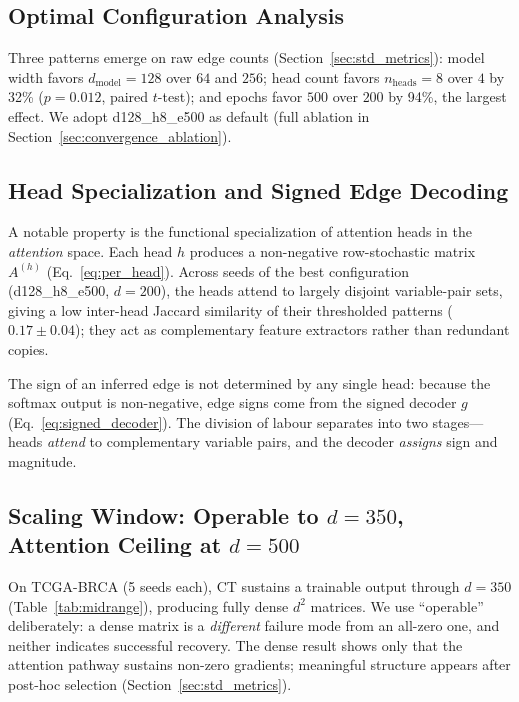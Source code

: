 \documentclass[12pt,a4paper]{article}
\begin{document}
\subsection{Optimal Configuration Analysis}

Three patterns emerge on raw edge counts (Section~\ref{sec:std_metrics}): model width favors $d_{\text{model}}=128$ over $64$ and $256$; head count favors $n_{\text{heads}}=8$ over $4$ by 32\% ($p=0.012$, paired $t$-test); and epochs favor $500$ over $200$ by 94\%, the largest effect. We adopt d128\_h8\_e500 as default (full ablation in Section~\ref{sec:convergence_ablation}).

\subsection{Head Specialization and Signed Edge Decoding}
\label{sec:head_spec}

A notable property is the functional specialization of attention heads in the \emph{attention} space. Each head $h$ produces a non-negative row-stochastic matrix $A^{(h)}$ (Eq.~\ref{eq:per_head}). Across seeds of the best configuration (d128\_h8\_e500, $d=200$), the heads attend to largely disjoint variable-pair sets, giving a low inter-head Jaccard similarity of their thresholded patterns ($0.17 \pm 0.04$); they act as complementary feature extractors rather than redundant copies.

The sign of an inferred edge is not determined by any single head: because the softmax output is non-negative, edge signs come from the signed decoder $g$ (Eq.~\ref{eq:signed_decoder}). The division of labour separates into two stages---heads \emph{attend} to complementary variable pairs, and the decoder \emph{assigns} sign and magnitude.

\subsection{Scaling Window: Operable to \texorpdfstring{$d=350$}{d=350}, Attention Ceiling at \texorpdfstring{$d=500$}{d=500}}

On TCGA-BRCA (5 seeds each), CT sustains a trainable output through $d=350$ (Table~\ref{tab:midrange}), producing fully dense $d^2$ matrices. We use ``operable'' deliberately: a dense matrix is a \emph{different} failure mode from an all-zero one, and neither indicates successful recovery. The dense result shows only that the attention pathway sustains non-zero gradients; meaningful structure appears after post-hoc selection (Section~\ref{sec:std_metrics}).
\end{document}
